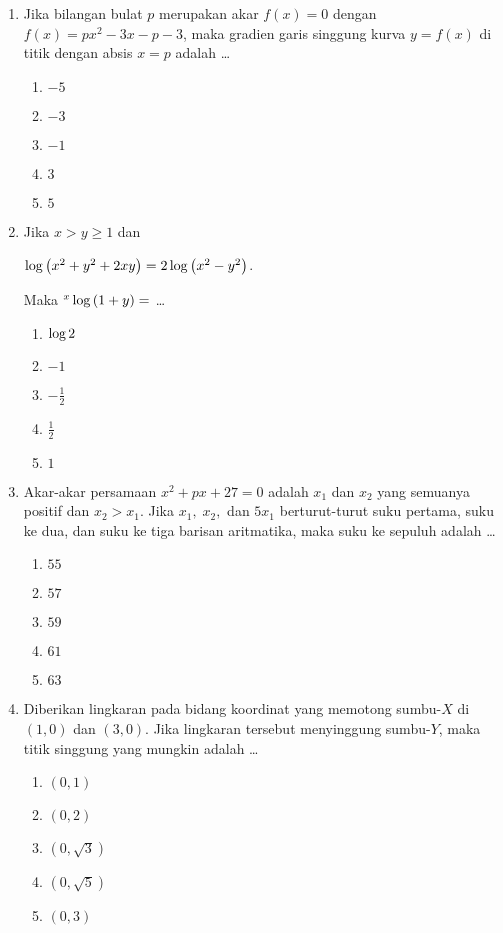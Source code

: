 \documentclass[A4,12PT, english, twocolumn]{journal}
\begin{document}
\begin{enumerate}
\item Jika bilangan bulat $p$ merupakan akar $f \left(x \right) = 0$ dengan $f \left(x \right) = px^2-3x-p-3$, maka gradien garis singgung kurva $y= f \left(x \right)$ di titik dengan absis $x=p$ adalah \dots
    \begin{enumerate}
        \item $-5$
        \item $-3$
        \item $-1$
        \item $3$
        \item $5$
    \end{enumerate}
    
\item Jika $x>y \geq 1$ dan
\begin{ceenter}
    $\Log{\left(x^2+y^2+2xy \right)} = 2 \Log{\left(x^2-y^2 \right)}$. \\
\end{ceenter}
Maka $^x\Log{\left(1+y \right)} =$ \dots
    \begin{enumerate}
        \item $\Log{2}$
        \item $-1$
        \item $-\frac{1}{2}$
        \item $\frac{1}{2}$
        \item $1$
    \end{enumerate}
    
\item Akar-akar persamaan $x^2+px+27=0$ adalah $x_1$ dan $x_2$ yang semuanya positif dan $x_2>x_1$. Jika $x_1, \; x_2,$ dan $5x_1$ berturut-turut suku pertama, suku ke dua, dan suku ke tiga barisan aritmatika, maka suku ke sepuluh adalah \dots
    \begin{enumerate}
        \item $55$
        \item $57$
        \item $59$
        \item $61$
        \item $63$
    \end{enumerate}
    
\item Diberikan lingkaran pada bidang koordinat yang memotong sumbu-$X$ di $\left(1,0 \right)$ dan $\left(3,0 \right)$. Jika lingkaran tersebut menyinggung sumbu-$Y$, maka titik singgung yang mungkin adalah \dots
    \begin{enumerate}
        \item $\left(0,1 \right)$
        \item $\left(0,2 \right)$
        \item $\left(0, \sqrt{3} \right)$
        \item $\left(0, \sqrt{5} \right)$
        \item $\left(0,3 \right)$
    \end{enumerate}
    

\end{enumerate}
\end{document}
